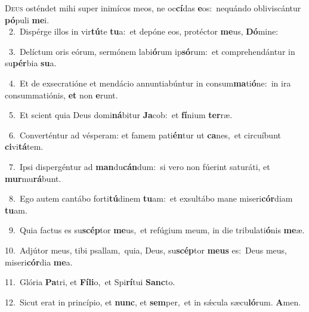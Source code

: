\lettrine{\initial\textcolor{\initialcolor}{D}}{eus} osténdet mihi super inimícos meos, ne oc\-\textbf{cí}\-das \textbf{e}\-os:~\star nequándo obliviscántur \textbf{pó}\-puli \textbf{me}\-i.\\
{\numbfont\textcolor{\numbcolor}{~2.}}~Dispérge illos in vir\-\textbf{tú}\-te \textbf{tu}\-a:~\star et depóne eos, protéctor \textbf{me}\-us, \textbf{Dó}\-mine:\par
{\numbfont\textcolor{\numbcolor}{~3.}}~Delíctum oris eórum, sermónem labi\-\textbf{ó}\-rum ip\-\textbf{só}\-rum:~\star et comprehendántur in su\-\textbf{pér}\-bia \textbf{su}\-a.\par
{\numbfont\textcolor{\numbcolor}{~4.}}~Et de exsecratióne et mendácio annuntiabúntur in consum\-\textbf{ma}\-ti\-\textbf{ó}\-ne:~\star in ira consummatiónis, \textbf{et} non \textbf{e}\-runt.\par
{\numbfont\textcolor{\numbcolor}{~5.}}~Et scient quia Deus domi\-\textbf{ná}\-bitur \textbf{Ja}\-cob:~\star et \textbf{fí}\-nium \textbf{ter}\-ræ.\par
{\numbfont\textcolor{\numbcolor}{~6.}}~Converténtur ad vésperam: et famem pati\-\textbf{én}\-tur ut \textbf{ca}\-nes,~\star et circuíbunt \textbf{ci}\-vi\-\textbf{tá}\-tem.\par
{\numbfont\textcolor{\numbcolor}{~7.}}~Ipsi dispergéntur ad \textbf{man}\-du\-\textbf{cán}\-dum:~\star si vero non fúerint saturáti, et \textbf{mur}\-mu\-\textbf{rá}\-bunt.\par
{\numbfont\textcolor{\numbcolor}{~8.}}~Ego autem cantábo forti\-\textbf{tú}\-dinem \textbf{tu}\-am:~\star et exsultábo mane miseri\-\textbf{cór}\-diam \textbf{tu}\-am.\par
{\numbfont\textcolor{\numbcolor}{~9.}}~Quia factus es su\-\textbf{scép}\-tor \textbf{me}\-us,~\star et refúgium meum, in die tribulati\-\textbf{ó}\-nis \textbf{me}\-æ.\par
{\numbfont\textcolor{\numbcolor}{10.}}~Adjútor meus, tibi psallam,~\dagger quia, Deus, su\-\textbf{scép}\-tor \textbf{me}\-\textbf{us} es:~\star Deus meus, miseri\-\textbf{cór}\-dia \textbf{me}\-a.\par
{\numbfont\textcolor{\numbcolor}{11.}}~Glória \textbf{Pa}\-tri, et \textbf{Fí}\-\textbf{li}o,~\star et Spi\-\textbf{rí}\-tui \textbf{Sanc}\-to.\par
{\numbfont\textcolor{\numbcolor}{12.}}~Sicut erat in princípio, et \textbf{nunc}\-, et \textbf{sem}\-per,~\star et in sǽcula sæcu\-\textbf{ló}\-rum. \textbf{A}\-men.\par
